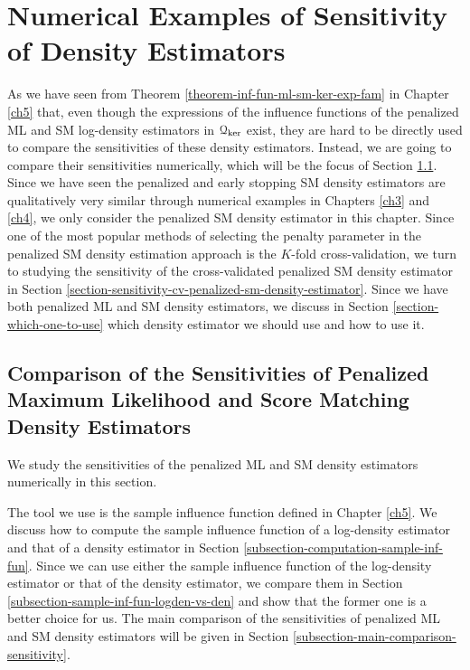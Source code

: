 \chapter{Numerical Examples of Sensitivity of Density Estimators}
\label{ch6}

As we have seen from Theorem \ref{theorem-inf-fun-ml-sm-ker-exp-fam} in Chapter \ref{ch5} that, even though the expressions of the influence functions of the penalized ML and SM log-density estimators in $\mathcal{Q}_{\ker}$ exist, they are hard to be directly used to compare the sensitivities of these density estimators. Instead, we are going to compare their sensitivities numerically, which will be the focus of Section \ref{section-numerical-comparison-sensitivity}. Since we have seen the penalized and early stopping SM density estimators are qualitatively very similar through numerical examples in Chapters \ref{ch3} and \ref{ch4}, we only consider the penalized SM density estimator in this chapter. Since one of the most popular methods of selecting the penalty parameter in the penalized SM density estimation approach is the $K$-fold cross-validation, we turn to studying the sensitivity of the cross-validated penalized SM density estimator in Section \ref{section-sensitivity-cv-penalized-sm-density-estimator}. %
Since we have both penalized ML and SM density estimators, we discuss in Section \ref{section-which-one-to-use} which density estimator we should use and how to use it. 


\section{Comparison of the Sensitivities of Penalized Maximum Likelihood and Score Matching Density Estimators}\label{section-numerical-comparison-sensitivity}

We study the sensitivities of the penalized ML and SM density estimators numerically in this section. 

The tool we use is the sample influence function defined in Chapter \ref{ch5}. We discuss how to compute the sample influence function of a log-density estimator and that of a density estimator in Section \ref{subsection-computation-sample-inf-fun}. Since we can use either the sample influence function of the log-density estimator or that of the density estimator, we compare them in Section \ref{subsection-sample-inf-fun-logden-vs-den} and show that the former one is a better choice for us. The main comparison of the sensitivities of penalized ML and SM density estimators will be given in Section \ref{subsection-main-comparison-sensitivity}. 


